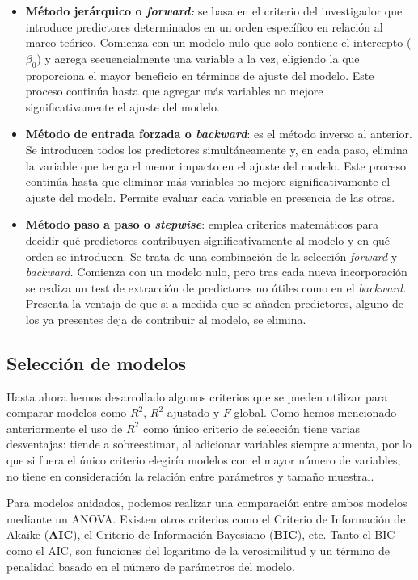 \documentclass[
  spanish,
  a4paper,
]{scrbook}
\begin{document}
\begin{itemize}
\item
  \textbf{Método jerárquico o \emph{forward:}} se basa en el criterio
  del investigador que introduce predictores determinados en un orden
  específico en relación al marco teórico. Comienza con un modelo nulo
  que solo contiene el intercepto (\(\beta_0\)) y agrega secuencialmente
  una variable a la vez, eligiendo la que proporciona el mayor beneficio
  en términos de ajuste del modelo. Este proceso continúa hasta que
  agregar más variables no mejore significativamente el ajuste del
  modelo.
\item
  \textbf{Método de entrada forzada o \emph{backward}}: es el método
  inverso al anterior. Se introducen todos los predictores
  simultáneamente y, en cada paso, elimina la variable que tenga el
  menor impacto en el ajuste del modelo. Este proceso continúa hasta que
  eliminar más variables no mejore significativamente el ajuste del
  modelo. Permite evaluar cada variable en presencia de las otras.
\item
  \textbf{Método paso a paso o \emph{stepwise}}: emplea criterios
  matemáticos para decidir qué predictores contribuyen
  significativamente al modelo y en qué orden se introducen. Se trata de
  una combinación de la selección \emph{forward} y \emph{backward.}
  Comienza con un modelo nulo, pero tras cada nueva incorporación se
  realiza un test de extracción de predictores no útiles como en el
  \emph{backward.} Presenta la ventaja de que si a medida que se añaden
  predictores, alguno de los ya presentes deja de contribuir al modelo,
  se elimina.
\end{itemize}

\subsection{Selección de modelos}\label{selecciuxf3n-de-modelos}

Hasta ahora hemos desarrollado algunos criterios que se pueden utilizar
para comparar modelos como \(R^2\), \(R^2\) ajustado y \(F\) global.
Como hemos mencionado anteriormente el uso de \(R^2\) como único
criterio de selección tiene varias desventajas: tiende a sobreestimar,
al adicionar variables siempre aumenta, por lo que si fuera el único
criterio elegiría modelos con el mayor número de variables, no tiene en
consideración la relación entre parámetros y tamaño muestral.

Para modelos anidados, podemos realizar una comparación entre ambos
modelos mediante un ANOVA. Existen otros criterios como el Criterio de
Información de Akaike (\textbf{AIC}), el Criterio de Información
Bayesiano (\textbf{BIC}), etc. Tanto el BIC como el AIC, son funciones
del logaritmo de la verosimilitud y un término de penalidad basado en el
número de parámetros del modelo.
\end{document}
